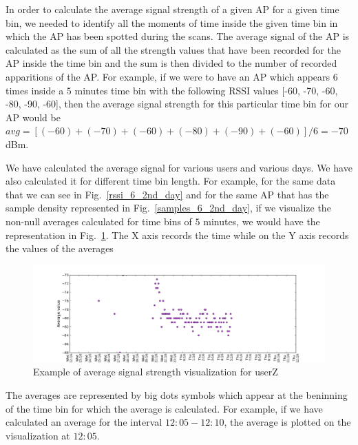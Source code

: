 In order to calculate the average signal strength of a given AP for a given time
bin, we needed to identify all the moments of time inside the given time bin in which
the AP has been spotted during the scans. The average signal of the AP is
calculated as the sum of all the strength values that have been recorded for the
AP inside the time bin and the sum is then divided to the number of recorded
apparitions of the AP. For example, if we were to have an AP which appears 6
times inside a $5$ minutes time bin with the following RSSI values [-60, -70,
-60, -80, -90, -60], then the average signal strength for this particular time
bin for our AP would be $avg = [(-60) + (-70) + (-60) + (-80) + (-90) +
(-60)] / 6= -70$ dBm.

We have calculated the average signal for various users and various days. We
have also calculated it for different time bin length. For example, for the same
data that we can see in Fig.~\ref{rssi_6_2nd_day} and for the same AP that has
the sample density represented in Fig.~\ref{samples_6_2nd_day}, if we visualize
the non-null averages calculated for time bins of $5$ minutes, we would have the
representation in Fig.~\ref{user_6_avg_1d_5m}. The X axis records the time
while on the Y axis records the values of the averages


\begin{figure}[h]
\centering
\includegraphics[width =\textwidth]{figures/combinations/user_6_sorted_1days_plot_14280_avg_sig.png}
\caption{Example of average signal strength visualization for userZ}
\label{user_6_avg_1d_5m}
\end{figure}

The averages are represented by big dots symbols which appear at the beninning
of the time bin for which the average is calculated. For example, if we have
calculated an average for the interval $12:05 - 12:10$, the average is plotted
on the visualization at $12:05$. 

